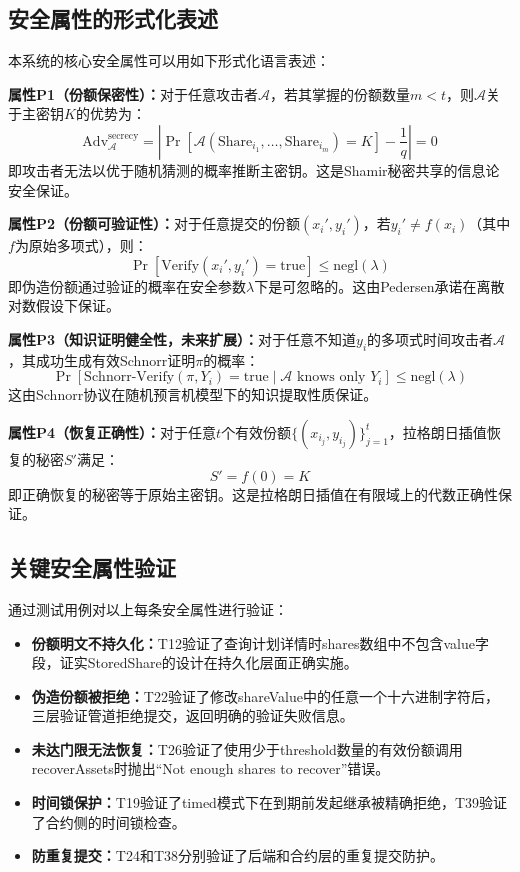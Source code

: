 \documentclass[UTF8,a4paper,zihao=-4,openany]{ctexrep}
\begin{document}
\subsection{安全属性的形式化表述}

本系统的核心安全属性可以用如下形式化语言表述：

\textbf{属性P1（份额保密性）：}对于任意攻击者$\mathcal{A}$，若其掌握的份额数量$m < t$，则$\mathcal{A}$关于主密钥$K$的优势为：
\[
\text{Adv}_{\mathcal{A}}^{\text{secrecy}} = \left|\Pr[\mathcal{A}(\text{Share}_{i_1},\dots,\text{Share}_{i_m}) = K] - \frac{1}{q}\right| = 0
\]
即攻击者无法以优于随机猜测的概率推断主密钥。这是Shamir秘密共享的信息论安全保证。

\textbf{属性P2（份额可验证性）：}对于任意提交的份额$(x_i', y_i')$，若$y_i' \neq f(x_i)$（其中$f$为原始多项式），则：
\[
\Pr[\text{Verify}(x_i', y_i') = \text{true}] \le \text{negl}(\lambda)
\]
即伪造份额通过验证的概率在安全参数$\lambda$下是可忽略的。这由Pedersen承诺在离散对数假设下保证。

\textbf{属性P3（知识证明健全性，未来扩展）：}对于任意不知道$y_i$的多项式时间攻击者$\mathcal{A}$，其成功生成有效Schnorr证明$\pi$的概率：
\[
\Pr[\text{Schnorr-Verify}(\pi, Y_i) = \text{true} \mid \mathcal{A} \text{ knows only } Y_i] \le \text{negl}(\lambda)
\]
这由Schnorr协议在随机预言机模型下的知识提取性质保证。

\textbf{属性P4（恢复正确性）：}对于任意$t$个有效份额$\{(x_{i_j}, y_{i_j})\}_{j=1}^{t}$，拉格朗日插值恢复的秘密$S'$满足：
\[
S' = f(0) = K
\]
即正确恢复的秘密等于原始主密钥。这是拉格朗日插值在有限域上的代数正确性保证。

\subsection{关键安全属性验证}

通过测试用例对以上每条安全属性进行验证：

\begin{itemize}
  \item \textbf{份额明文不持久化：}T12验证了查询计划详情时shares数组中不包含value字段，证实StoredShare的设计在持久化层面正确实施。
  \item \textbf{伪造份额被拒绝：}T22验证了修改shareValue中的任意一个十六进制字符后，三层验证管道拒绝提交，返回明确的验证失败信息。
  \item \textbf{未达门限无法恢复：}T26验证了使用少于threshold数量的有效份额调用recoverAssets时抛出“Not enough shares to recover”错误。
  \item \textbf{时间锁保护：}T19验证了timed模式下在到期前发起继承被精确拒绝，T39验证了合约侧的时间锁检查。
  \item \textbf{防重复提交：}T24和T38分别验证了后端和合约层的重复提交防护。
\end{itemize}
\end{document}
